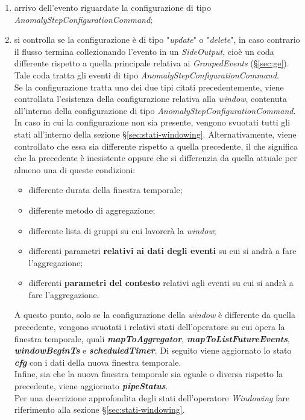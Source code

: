 \begin{enumerate}
	\item{arrivo dell'evento riguardate la configurazione di tipo \textit{AnomalyStepConfigurationCommand};}
	\item{si controlla se la configurazione è di tipo "\textit{update}" o "\textit{delete}", in caso contrario il flusso termina collezionando l'evento in un \textit{SideOutput}, cioè un coda differente rispetto a quella principale relativa ai \textit{GroupedEvents} (\S\ref{sec:ge}). Tale coda tratta gli eventi di tipo \textit{AnomalyStepConfigurationCommand}.\\
	Se la configurazione tratta uno dei due tipi citati precedentemente, viene controllata l'esistenza della configurazione relativa alla \textit{window}, contenuta all'interno della configurazione di tipo \textit{AnomalyStepConfigurationCommand}. In caso in cui la configurazione non sia presente, vengono svuotati tutti gli stati all'interno della sezione \S\ref{sec:stati-windowing}. Alternativamente, viene controllato che essa sia differente rispetto a quella precedente, il che significa che la precedente è inesistente oppure che si differenzia da quella attuale per almeno una di queste condizioni:
	\begin{itemize}
		\item{differente durata della finestra temporale;}
		\item{differente metodo di aggregazione;}
		\item{differente lista di gruppi su cui lavorerà la \textit{window};}
		\item{differenti parametri \textbf{relativi ai dati degli eventi} su cui si andrà a fare l'aggregazione;}
		\item{differenti \textbf{parametri del contesto} relativi agli eventi su cui si andrà a fare l'aggregazione.}
	\end{itemize}
	
	A questo punto, solo se la configurazione della \textit{window} è differente da quella precedente, vengono svuotati i relativi stati dell'operatore su cui opera la finestra temporale, quali \textbf{\textit{mapToAggregator}}, \textbf{\textit{mapToListFutureEvents}}, \textbf{\textit{windowBeginTs}} e \textbf{\textit{scheduledTimer}}. Di seguito viene aggiornato lo stato \textbf{\textit{cfg}} con i dati della nuova finestra temporale.\\
Infine, sia che la nuova finestra temporale sia eguale o diversa rispetto la precedente, viene aggiornato \textbf{\textit{pipeStatus}}.\\
Per una descrizione approfondita degli stati dell'operatore \textit{Windowing} fare riferimento alla sezione \S\ref{sec:stati-windowing}.}
\end{enumerate}

